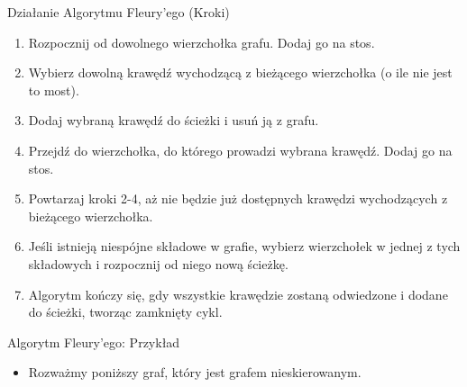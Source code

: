 \documentclass[polish,envcountsect,10pt]{beamer}
\begin{document}
\begin{frame}{Działanie Algorytmu Fleury'ego (Kroki)}
    \begin{enumerate}
        \item Rozpocznij od dowolnego wierzchołka grafu. Dodaj go na stos.
        \item Wybierz dowolną krawędź wychodzącą z bieżącego wierzchołka (o ile nie jest to most).
        \item Dodaj wybraną krawędź do ścieżki i usuń ją z grafu.
        \item Przejdź do wierzchołka, do którego prowadzi wybrana krawędź. Dodaj go na stos.
        \item Powtarzaj kroki 2-4, aż nie będzie już dostępnych krawędzi wychodzących z bieżącego wierzchołka.
        \item Jeśli istnieją niespójne składowe w grafie, wybierz wierzchołek w jednej z tych składowych i rozpocznij od niego nową ścieżkę.
        \item Algorytm kończy się, gdy wszystkie krawędzie zostaną odwiedzone i dodane do ścieżki, tworząc zamknięty cykl.
    \end{enumerate}
\end{frame}

\begin{frame}{Algorytm Fleury'ego: Przykład}
    \begin{itemize}
          \item Rozważmy poniższy graf, który jest grafem nieskierowanym.
    \end{itemize}
    \begin{center}
    \end{center}
\end{frame}
    
\end{document}
